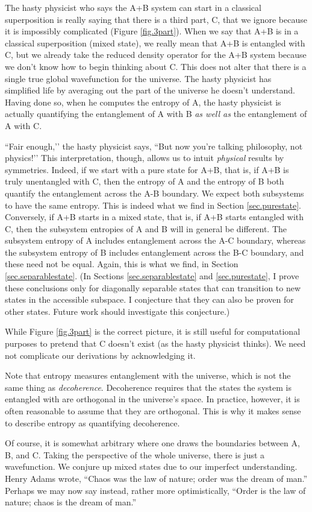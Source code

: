 The hasty physicist who says the A+B system can start in a classical superposition is really saying that there is a third part, C, that we ignore because it is impossibly complicated (Figure \ref{fig.3part}). When we say that A+B is in a classical superposition (mixed state), we really mean that A+B is entangled with C, but we already take the reduced density operator for the A+B system because we don’t know how to begin thinking about C. This does not alter that there is a single true global wavefunction for the universe. The hasty physicist has simplified life by averaging out the part of the universe he doesn’t understand. Having done so, when he computes the entropy of A, the hasty physicist is actually quantifying the entanglement of A with B \emph{as well as} the entanglement of A with C.

``Fair enough,’’ the hasty physicist says, ``But now you’re talking philosophy, not physics!’’ This interpretation, though, allows us to intuit \emph{physical} results by symmetries. Indeed, if we start with a pure state for A+B, that is, if A+B is truly unentangled with C, then the entropy of A and the entropy of B both quantify the entanglement across the A-B boundary. We expect both subsystems to have the same entropy. This is indeed what we find in Section \ref{sec.purestate}. Conversely, if A+B starts in a mixed state, that is, if A+B starts entangled with C, then the subsystem entropies of A and B will in general be different. The subsystem entropy of A includes entanglement across the A-C boundary, whereas the subsystem entropy of B includes entanglement across the B-C boundary, and these need not be equal. Again, this is what we find, in Section \ref{sec.separablestate}. (In Sections \ref{sec.separablestate} and \ref{sec.purestate}, I prove these conclusions only for diagonally separable states that can transition to new states in the accessible subspace. I conjecture that they can also be proven for other states. Future work should investigate this conjecture.)

While Figure \ref{fig.3part} is the correct picture, it is still useful for computational purposes to pretend that C doesn’t exist (as the hasty physicist thinks). We need not complicate our derivations by acknowledging it.

Note that entropy measures entanglement with the universe, which is not the same thing as \emph{decoherence}. Decoherence requires that the states the system is entangled with are orthogonal in the universe’s space. In practice, however, it is often reasonable to assume that they are orthogonal. This is why it makes sense to describe entropy as quantifying decoherence.

Of course, it is somewhat arbitrary where one draws the boundaries between A, B, and C. Taking the perspective of the whole universe, there is just a wavefunction. We conjure up mixed states due to our imperfect understanding. 
Henry Adams wrote, “Chaos was the law of nature; order was the dream of man.” Perhaps we may now say instead, rather more optimistically, “Order is the law of nature; chaos is the dream of man.”

